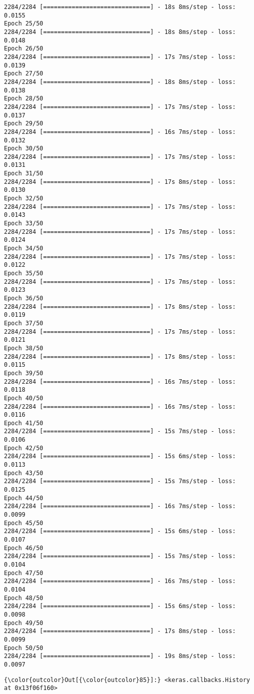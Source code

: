 \documentclass[11pt]{article}
\begin{document}
\begin{Verbatim}[commandchars=\\\{\}]
2284/2284 [==============================] - 18s 8ms/step - loss: 0.0155
Epoch 25/50
2284/2284 [==============================] - 18s 8ms/step - loss: 0.0148
Epoch 26/50
2284/2284 [==============================] - 17s 7ms/step - loss: 0.0139
Epoch 27/50
2284/2284 [==============================] - 18s 8ms/step - loss: 0.0138
Epoch 28/50
2284/2284 [==============================] - 17s 7ms/step - loss: 0.0137
Epoch 29/50
2284/2284 [==============================] - 16s 7ms/step - loss: 0.0132
Epoch 30/50
2284/2284 [==============================] - 17s 7ms/step - loss: 0.0131
Epoch 31/50
2284/2284 [==============================] - 17s 8ms/step - loss: 0.0130
Epoch 32/50
2284/2284 [==============================] - 17s 7ms/step - loss: 0.0143
Epoch 33/50
2284/2284 [==============================] - 17s 7ms/step - loss: 0.0124
Epoch 34/50
2284/2284 [==============================] - 17s 7ms/step - loss: 0.0122
Epoch 35/50
2284/2284 [==============================] - 17s 7ms/step - loss: 0.0123
Epoch 36/50
2284/2284 [==============================] - 17s 8ms/step - loss: 0.0119
Epoch 37/50
2284/2284 [==============================] - 17s 7ms/step - loss: 0.0121
Epoch 38/50
2284/2284 [==============================] - 17s 8ms/step - loss: 0.0115
Epoch 39/50
2284/2284 [==============================] - 16s 7ms/step - loss: 0.0118
Epoch 40/50
2284/2284 [==============================] - 16s 7ms/step - loss: 0.0116
Epoch 41/50
2284/2284 [==============================] - 15s 7ms/step - loss: 0.0106
Epoch 42/50
2284/2284 [==============================] - 15s 6ms/step - loss: 0.0113
Epoch 43/50
2284/2284 [==============================] - 15s 7ms/step - loss: 0.0125
Epoch 44/50
2284/2284 [==============================] - 16s 7ms/step - loss: 0.0099
Epoch 45/50
2284/2284 [==============================] - 15s 6ms/step - loss: 0.0107
Epoch 46/50
2284/2284 [==============================] - 15s 7ms/step - loss: 0.0104
Epoch 47/50
2284/2284 [==============================] - 16s 7ms/step - loss: 0.0104
Epoch 48/50
2284/2284 [==============================] - 15s 6ms/step - loss: 0.0098
Epoch 49/50
2284/2284 [==============================] - 17s 8ms/step - loss: 0.0099
Epoch 50/50
2284/2284 [==============================] - 19s 8ms/step - loss: 0.0097

    \end{Verbatim}

\begin{Verbatim}[commandchars=\\\{\}]
{\color{outcolor}Out[{\color{outcolor}85}]:} <keras.callbacks.History at 0x13f06f160>
\end{Verbatim}
            
\end{document}
